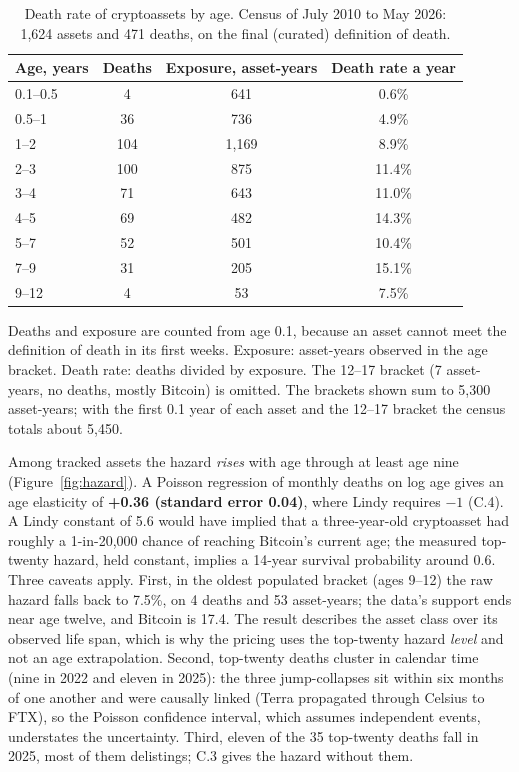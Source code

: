 \documentclass[11pt]{article}
\begin{document}
\begin{table}[ht]\centering\small
\caption{Death rate of cryptoassets by age. Census of July 2010 to May 2026: 1,624 assets and 471 deaths, on the final (curated) definition of death.}
\label{tab:hazard}
\begin{tabular}{lccc}
\toprule
Age, years & Deaths & Exposure, asset-years & Death rate a year \\
\midrule
0.1--0.5 & 4 & 641 & 0.6\% \\
0.5--1 & 36 & 736 & 4.9\% \\
1--2 & 104 & 1{,}169 & 8.9\% \\
2--3 & 100 & 875 & 11.4\% \\
3--4 & 71 & 643 & 11.0\% \\
4--5 & 69 & 482 & 14.3\% \\
5--7 & 52 & 501 & 10.4\% \\
7--9 & 31 & 205 & 15.1\% \\
9--12 & 4 & 53 & 7.5\% \\
\bottomrule
\end{tabular}
\par\smallskip\parbox{0.8\textwidth}{\footnotesize Deaths and exposure are counted from age 0.1, because an asset cannot meet the definition of death in its first weeks. Exposure: asset-years observed in the age bracket. Death rate: deaths divided by exposure. The 12--17 bracket (7 asset-years, no deaths, mostly Bitcoin) is omitted. The brackets shown sum to 5,300 asset-years; with the first 0.1 year of each asset and the 12--17 bracket the census totals about 5,450.}
\end{table}

Among tracked assets the hazard \emph{rises} with age through at least age nine (Figure~\ref{fig:hazard}). A Poisson regression of monthly deaths on log age gives an age elasticity of \textbf{+0.36 (standard error 0.04)}, where Lindy requires $-1$ (C.4). A Lindy constant of 5.6 would have implied that a three-year-old cryptoasset had roughly a 1-in-20,000 chance of reaching Bitcoin's current age; the measured top-twenty hazard, held constant, implies a 14-year survival probability around 0.6. Three caveats apply. First, in the oldest populated bracket (ages 9--12) the raw hazard falls back to 7.5\%, on 4 deaths and 53 asset-years; the data's support ends near age twelve, and Bitcoin is 17.4. The result describes the asset class over its observed life span, which is why the pricing uses the top-twenty hazard \emph{level} and not an age extrapolation. Second, top-twenty deaths cluster in calendar time (nine in 2022 and eleven in 2025): the three jump-collapses sit within six months of one another and were causally linked (Terra propagated through Celsius to FTX), so the Poisson confidence interval, which assumes independent events, understates the uncertainty. Third, eleven of the 35 top-twenty deaths fall in 2025, most of them delistings; C.3 gives the hazard without them.
\end{document}
